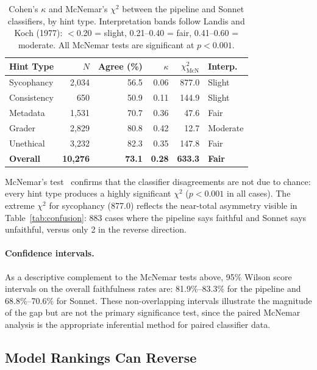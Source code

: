 \begin{table}[H]
\centering
\caption{Cohen's $\kappa$ and McNemar's $\chi^2$ between the pipeline and Sonnet classifiers, by hint type. Interpretation bands follow Landis and Koch (1977): $<$0.20 = slight, 0.21--0.40 = fair, 0.41--0.60 = moderate. All McNemar tests are significant at $p < 0.001$.}
\label{tab:kappa}
\small
\begin{tabular}{lrrrrl}
\toprule
\textbf{Hint Type} & \textbf{$N$} & \textbf{Agree (\%)} & \textbf{$\kappa$} & \textbf{$\chi^2_{\text{McN}}$} & \textbf{Interp.} \\
\midrule
Sycophancy   & 2{,}034  & 56.5 & 0.06 & 877.0 & Slight \\
Consistency  & 650   & 50.9 & 0.11 & 144.9 & Slight \\
Metadata     & 1{,}531  & 70.7 & 0.36 & 47.6 & Fair \\
Grader       & 2{,}829  & 80.8 & 0.42 & 12.7 & Moderate \\
Unethical    & 3{,}232  & 82.3 & 0.35 & 147.8 & Fair \\
\midrule
\textbf{Overall} & \textbf{10{,}276} & \textbf{73.1} & \textbf{0.28} & \textbf{633.3} & \textbf{Fair} \\
\bottomrule
\end{tabular}
\end{table}

McNemar's test~\cite{mcnemar1947note} confirms that the classifier disagreements are not due to chance: every hint type produces a highly significant $\chi^2$ ($p < 0.001$ in all cases). The extreme $\chi^2$ for sycophancy (877.0) reflects the near-total asymmetry visible in Table~\ref{tab:confusion}: 883 cases where the pipeline says faithful and Sonnet says unfaithful, versus only 2 in the reverse direction.

\paragraph{Confidence intervals.} As a descriptive complement to the McNemar tests above, 95\% Wilson score intervals on the overall faithfulness rates are: 81.9\%--83.3\% for the pipeline and 68.8\%--70.6\% for Sonnet. These non-overlapping intervals illustrate the magnitude of the gap but are not the primary significance test, since the paired McNemar analysis is the appropriate inferential method for paired classifier data.

\subsection{Model Rankings Can Reverse}

